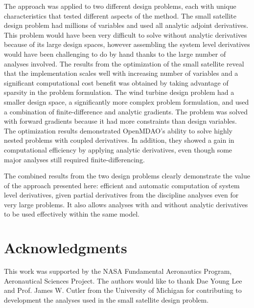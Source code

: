 \documentclass[]{aiaa-tc} %
\begin{document}
      The approach was applied to two different design problems, each with unique characteristics that 
      tested different aspects of the method. The small satellite design problem had millions of variables and used all analytic adjoint derivatives.
      This problem would have been very difficult to solve without analytic derivatives because of its large design spaces, however assembling the 
      system level derivatives would have been challenging to do by hand thanks to the large number of analyses involved. 
      The results from the optimization of the small satellite reveal that the implementation scales well with increasing 
      number of variables and a significant computational cost benefit was obtained by taking advantage of 
      sparsity in the problem formulation. The wind turbine design problem had a smaller design space, a 
      significantly more complex problem formulation, and used a combination of finite-difference and analytic 
      gradients. The problem was solved with forward gradients because it had more constraints than design variables. 
      The optimization results demonstrated OpenMDAO's ability to solve highly nested problems with coupled derivatives.
      In addition, they showed a gain in computational efficiency by applying analytic derivatives, even though some major 
      analyses still required finite-differencing. 

      The combined results from the two design problems clearly demonstrate the value of the approach presented here: efficient and 
      automatic computation of system level derivatives, given partial derivatives from the discipline analyses 
      even for very large problems. It also allows analyses with and without analytic derivatives to be used effectively 
      within the same model. 


  \section{Acknowledgments}

      This work was supported by the NASA Fundamental Aeronautics Program, Aeronautical Sciences Project. 
      The authors would like to thank Dae Young Lee and Prof. James W. Cutler from the University of Michigan 
      for contributing to development the analyses used in the small satellite design problem. 

  
\end{document}
